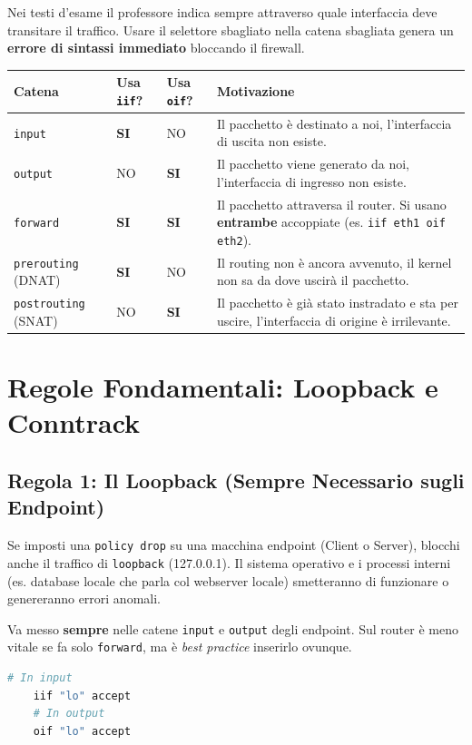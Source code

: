 \documentclass[12pt,a4paper]{report}
\begin{document}
Nei testi d'esame il professore indica sempre attraverso quale interfaccia deve transitare il traffico. Usare il selettore sbagliato nella catena sbagliata genera un \textbf{errore di sintassi immediato} bloccando il firewall.

\begin{table}[h!]
	\centering
	\begin{tabular}{|p{3cm}|p{2cm}|p{2cm}|p{7cm}|}
		\hline
		\textbf{Catena} & \textbf{Usa \texttt{iif}?} & \textbf{Usa \texttt{oif}?} & \textbf{Motivazione} \\ \hline
		\texttt{input} & \textbf{SI} & NO & Il pacchetto è destinato a noi, l'interfaccia di uscita non esiste. \\ \hline
		\texttt{output} & NO & \textbf{SI} & Il pacchetto viene generato da noi, l'interfaccia di ingresso non esiste. \\ \hline
		\texttt{forward} & \textbf{SI} & \textbf{SI} & Il pacchetto attraversa il router. Si usano \textbf{entrambe} accoppiate (es. \texttt{iif eth1 oif eth2}). \\ \hline
		\texttt{prerouting} (DNAT) & \textbf{SI} & NO & Il routing non è ancora avvenuto, il kernel non sa da dove uscirà il pacchetto. \\ \hline
		\texttt{postrouting} (SNAT) & NO & \textbf{SI} & Il pacchetto è già stato instradato e sta per uscire, l'interfaccia di origine è irrilevante. \\ \hline
	\end{tabular}
\end{table}

\section{Regole Fondamentali: Loopback e Conntrack}

\subsection{Regola 1: Il Loopback (Sempre Necessario sugli Endpoint)}
Se imposti una \texttt{policy drop} su una macchina endpoint (Client o Server), blocchi anche il traffico di \texttt{loopback} (127.0.0.1). Il sistema operativo e i processi interni (es. database locale che parla col webserver locale) smetteranno di funzionare o genereranno errori anomali.
\begin{nota}
	Va messo \textbf{sempre} nelle catene \texttt{input} e \texttt{output} degli endpoint. Sul router è meno vitale se fa solo \texttt{forward}, ma è \textit{best practice} inserirlo ovunque.
\end{nota}
\begin{lstlisting}[language=bash]
	# In input
	iif "lo" accept
	# In output
	oif "lo" accept
\end{lstlisting}
	
\end{document}
